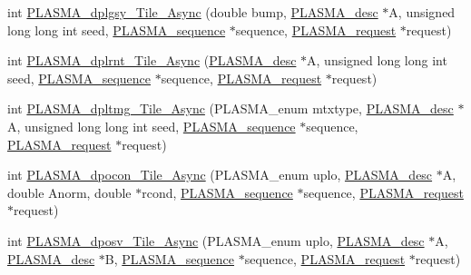 \begin{DoxyCompactItemize}
\item 
int \hyperlink{group__double__Tile__Async_ga0566c8b14de459fc52c59cffea1386f9_ga0566c8b14de459fc52c59cffea1386f9}{P\+L\+A\+S\+M\+A\+\_\+dplgsy\+\_\+\+Tile\+\_\+\+Async} (double bump, \hyperlink{structplasma__desc__t}{P\+L\+A\+S\+M\+A\+\_\+desc} $\ast$A, unsigned long long int seed, \hyperlink{structplasma__sequence__t}{P\+L\+A\+S\+M\+A\+\_\+sequence} $\ast$sequence, \hyperlink{structplasma__request__t}{P\+L\+A\+S\+M\+A\+\_\+request} $\ast$request)
\item 
int \hyperlink{group__double__Tile__Async_ga3e4822e5b39e2cf247b68024f2f970ec_ga3e4822e5b39e2cf247b68024f2f970ec}{P\+L\+A\+S\+M\+A\+\_\+dplrnt\+\_\+\+Tile\+\_\+\+Async} (\hyperlink{structplasma__desc__t}{P\+L\+A\+S\+M\+A\+\_\+desc} $\ast$A, unsigned long long int seed, \hyperlink{structplasma__sequence__t}{P\+L\+A\+S\+M\+A\+\_\+sequence} $\ast$sequence, \hyperlink{structplasma__request__t}{P\+L\+A\+S\+M\+A\+\_\+request} $\ast$request)
\item 
int \hyperlink{group__double__Tile__Async_gad5f7e8a9314c47b98512de879788937b_gad5f7e8a9314c47b98512de879788937b}{P\+L\+A\+S\+M\+A\+\_\+dpltmg\+\_\+\+Tile\+\_\+\+Async} (P\+L\+A\+S\+M\+A\+\_\+enum mtxtype, \hyperlink{structplasma__desc__t}{P\+L\+A\+S\+M\+A\+\_\+desc} $\ast$A, unsigned long long int seed, \hyperlink{structplasma__sequence__t}{P\+L\+A\+S\+M\+A\+\_\+sequence} $\ast$sequence, \hyperlink{structplasma__request__t}{P\+L\+A\+S\+M\+A\+\_\+request} $\ast$request)
\item 
int \hyperlink{group__double__Tile__Async_ga063f8620b455630558987b2441641106_ga063f8620b455630558987b2441641106}{P\+L\+A\+S\+M\+A\+\_\+dpocon\+\_\+\+Tile\+\_\+\+Async} (P\+L\+A\+S\+M\+A\+\_\+enum uplo, \hyperlink{structplasma__desc__t}{P\+L\+A\+S\+M\+A\+\_\+desc} $\ast$A, double Anorm, double $\ast$rcond, \hyperlink{structplasma__sequence__t}{P\+L\+A\+S\+M\+A\+\_\+sequence} $\ast$sequence, \hyperlink{structplasma__request__t}{P\+L\+A\+S\+M\+A\+\_\+request} $\ast$request)
\item 
int \hyperlink{group__double__Tile__Async_ga9b8f454be5bb21dc378584a3f4107c90_ga9b8f454be5bb21dc378584a3f4107c90}{P\+L\+A\+S\+M\+A\+\_\+dposv\+\_\+\+Tile\+\_\+\+Async} (P\+L\+A\+S\+M\+A\+\_\+enum uplo, \hyperlink{structplasma__desc__t}{P\+L\+A\+S\+M\+A\+\_\+desc} $\ast$A, \hyperlink{structplasma__desc__t}{P\+L\+A\+S\+M\+A\+\_\+desc} $\ast$B, \hyperlink{structplasma__sequence__t}{P\+L\+A\+S\+M\+A\+\_\+sequence} $\ast$sequence, \hyperlink{structplasma__request__t}{P\+L\+A\+S\+M\+A\+\_\+request} $\ast$request)
\item 

\end{DoxyCompactItemize}
